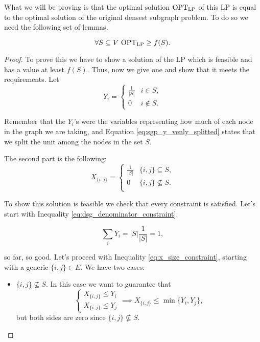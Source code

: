 What we will be proving is that the optimal solution $\text{OPT}_{\text{LP}}$ of this LP is equal to the optimal solution of the original densest subgraph problem. To do so we need the following set of lemmas.

\begin{lem}\label{lem:dsp:lem1}
\begin{equation}
\forall S \subseteq V\ \text{OPT}_{\text{LP}} \geq f(S).
\end{equation}
\end{lem}

\begin{proof}
To prove this we have to show a solution of the LP which is feasible and has a value at least $f(S)$. Thus, now we give one and show that it meets the requirements. Let
\begin{equation}\label{eq:sgp_y_venly_splitted}
    Y_i = 
    \begin{cases}
    \frac{1}{|S|} & i \in S,\\
    0 & i \not\in S.
    \end{cases}
\end{equation}

Remember that the $Y_i$'s were the variables representing how much of each node in the graph we are taking, and Equation \ref{eq:sgp_y_venly_splitted} states that we split the unit among the nodes in the set $S$.

The second part is the following:
\begin{equation}
    X_{\{i, j\}} = 
    \begin{cases}
    \frac{1}{|S|} & \{i, j\} \subseteq S,\\
    0 & \{i, j\} \not\subseteq S.\\
    \end{cases}
\end{equation}

To show this solution is feasible we check that every constraint is satisfied. Let's start with Inequality \ref{eq:dsg_denominator_constraint}.

\begin{equation}
\sum_{i} Y_i = |S| \frac{1}{|S|} = 1,
\end{equation}

so far, so good. Let's proceed with Inequality \ref{eq:x_size_constraint}, starting with a generic $\{i, j\} \in E$. We have two cases:

\begin{itemize}
\item $\{i, j\} \not\subseteq S$. In this case we want to guarantee that
\begin{equation}
\begin{cases}
X_{\{i, j\}} \leq Y_i\\
X_{\{i, j\}} \leq Y_j
\end{cases}
\implies X_{\{i, j\}} \leq \min{\{Y_i, Y_j\}},
\end{equation}
but both sides are zero since $\{i, j\} \not\subseteq S$.


\end{itemize}
\end{proof}
